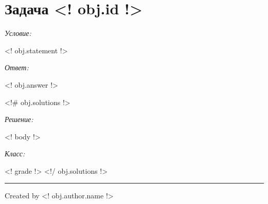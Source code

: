 \documentclass{article}
\newcommand{\tmp}[1]{\noindent\par\textit{#1: }\nopagebreak\par}
\begin{document}
    \section{Задача \textnumero <! obj.id !>}
    \tmp{Условие}
    <!{ obj.statement }!>
    \tmp{Ответ}
    <!{ obj.answer }!>

    <!# obj.solutions !>
        \tmp{Решение}
        <!{ body }!>
        \tmp{Класс}
        <!{ grade }!>
    <!/ obj.solutions !>
    
    \noindent\rule{\textwidth}{0.2pt}
    Created by <! obj.author.name !>
\end{document}
